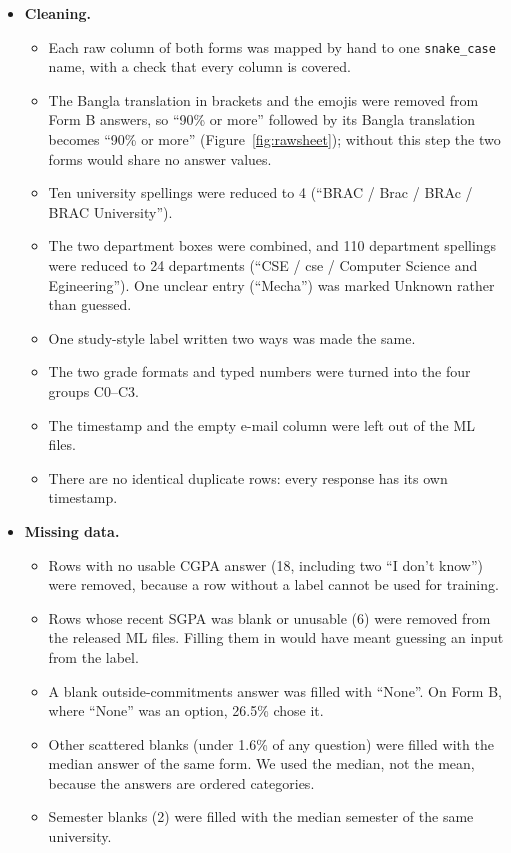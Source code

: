 \documentclass[11pt,a4paper]{article}
\begin{document}
\begin{itemize}
\item \textbf{Cleaning.}
  \begin{itemize}
  \item Each raw column of both forms was mapped by hand to one \texttt{snake\_case} name, with a check that every column is covered.
  \item The Bangla translation in brackets and the emojis were removed from Form B answers, so ``90\% or more'' followed by its Bangla translation becomes ``90\% or more'' (Figure~\ref{fig:rawsheet}); without this step the two forms would share no answer values.
  \item Ten university spellings were reduced to 4 (``BRAC / Brac / BRAc / BRAC University'').
  \item The two department boxes were combined, and 110 department spellings were reduced to 24 departments (``CSE / cse / Computer Science and Egineering''). One unclear entry (``Mecha'') was marked Unknown rather than guessed.
  \item One study-style label written two ways was made the same.
  \item The two grade formats and typed numbers were turned into the four groups C0--C3.
  \item The timestamp and the empty e-mail column were left out of the ML files.
  \item There are no identical duplicate rows: every response has its own timestamp.
  \end{itemize}
\item \textbf{Missing data.}
  \begin{itemize}
  \item Rows with no usable CGPA answer (18, including two ``I don't know'') were removed, because a row without a label cannot be used for training.
  \item Rows whose recent SGPA was blank or unusable (6) were removed from the released ML files. Filling them in would have meant guessing an input from the label.
  \item A blank outside-commitments answer was filled with ``None''. On Form B, where ``None'' was an option, 26.5\% chose it.
  \item Other scattered blanks (under 1.6\% of any question) were filled with the median answer of the same form. We used the median, not the mean, because the answers are ordered categories.
  \item Semester blanks (2) were filled with the median semester of the same university.

\end{itemize}
\end{itemize}
\end{document}
